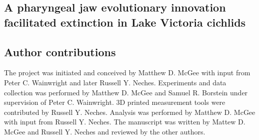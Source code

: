 \begin{refsection}

\chapter{A pharyngeal jaw evolutionary innovation facilitated extinction in Lake Victoria cichlids}


\section{Author contributions}

The project was initiated and conceived by Matthew D. McGee with input
from Peter C. Wainwright and later Russell Y. Neches. Experiments and
data collection was performed by Matthew D. McGee and Samuel R.
Borstein under supervision of Peter C. Wainwright. 3D printed
measurement tools were contributed by Russell Y. Neches. Analysis was
performed by Matthew D. McGee with input from Russell Y. Neches. The
manuscript was written by Mattew D. McGee and Russell Y. Neches and
reviewed by the other authors. 





\printbibliography[heading=subbibliography]

\end{refsection}
